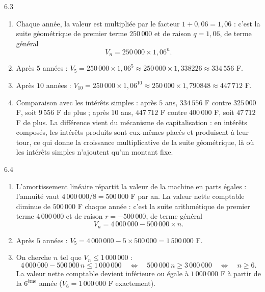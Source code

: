 \begin{corrige}{6.3}
\begin{enumerate}
\item Chaque année, la valeur est multipliée par le facteur $1 + 0{,}06 = 1{,}06$ : c'est la suite géométrique de premier terme $250\,000$ et de raison $q = 1{,}06$, de terme général
\[
V_{n} = 250\,000 \times 1{,}06^{n} .
\]
\item Après $5$ années : $V_{5} = 250\,000 \times 1{,}06^{5} \approx 250\,000 \times 1{,}338226 \approx 334\,556$ F.
\item Après $10$ années : $V_{10} = 250\,000 \times 1{,}06^{10} \approx 250\,000 \times 1{,}790848 \approx 447\,712$ F.
\item Comparaison avec les intérêts simples : après $5$ ans, $334\,556$ F contre $325\,000$ F, soit $9\,556$ F de plus ; après $10$ ans, $447\,712$ F contre $400\,000$ F, soit $47\,712$ F de plus. La différence vient du mécanisme de capitalisation : en intérêts composés, les intérêts produits sont eux-mêmes placés et produisent à leur tour, ce qui donne la croissance multiplicative de la suite géométrique, là où les intérêts simples n'ajoutent qu'un montant fixe.
\end{enumerate}
\end{corrige}

\begin{corrige}{6.4}
\begin{enumerate}
\item L'amortissement linéaire répartit la valeur de la machine en parts égales : l'annuité vaut $4\,000\,000 / 8 = 500\,000$ F par an. La valeur nette comptable diminue de $500\,000$ F chaque année : c'est la suite arithmétique de premier terme $4\,000\,000$ et de raison $r = -500\,000$, de terme général
\[
V_{n} = 4\,000\,000 - 500\,000 \times n .
\]
\item Après $5$ années : $V_{5} = 4\,000\,000 - 5 \times 500\,000 = 1\,500\,000$ F.
\item On cherche $n$ tel que $V_{n} \leqslant 1\,000\,000$ :
\[
4\,000\,000 - 500\,000\,n \leqslant 1\,000\,000
\quad\Longleftrightarrow\quad
500\,000\,n \geqslant 3\,000\,000
\quad\Longleftrightarrow\quad
n \geqslant 6 .
\]
La valeur nette comptable devient inférieure ou égale à $1\,000\,000$ F à partir de la $6^{\text{ème}}$ année ($V_{6} = 1\,000\,000$ F exactement).
\end{enumerate}
\end{corrige}
